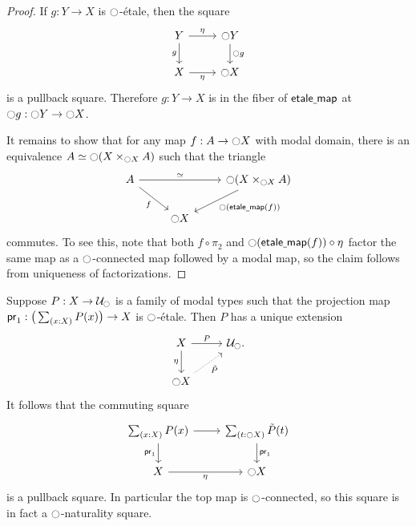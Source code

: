 \documentclass[9pt,twosided]{amsart}
\begin{document}
\begin{proof}
If $g:Y\to X$ is ${\ocircle}$-\'etale, then the square
\begin{equation*}
\begin{tikzcd}
Y \arrow[d,swap,"g"] \arrow[r,"\modalunit"] & \modal Y \arrow[d,"\modal g"] \\
X \arrow[r,swap,"\modalunit"] & \modal X
\end{tikzcd}
\end{equation*}
is a pullback square. Therefore $g:Y\to X$ is in the fiber of $\mathsf{etale\underline{\ }{}map}$ at ${\ocircle} g : {\ocircle} Y\to{\ensuremath{\ocircle}} X$. 

It remains to show that for any map $f:A\to{\ensuremath{\ocircle}} X$ with modal domain, there is an equivalence $\eqv{A}{\modal (X\times_{\modal X} A)}$ such that the triangle
\begin{equation*}
\begin{tikzcd}
A \arrow[dr,swap,"f"] \arrow[rr,"\eqvsym"] & & \modal (X\times_{\modal X} A) \arrow[dl,"\modal(\etmap(f))"] \\
& \modal X
\end{tikzcd}
\end{equation*}
commutes. To see this, note that both $f\circ \pi_2$ and ${\ocircle}(\mathsf{etale\underline{\ }{}map}(f))\circ {\eta_{}}$ factor the same map as a ${\ocircle}$-connected map followed by a modal map, so the claim follows from uniqueness of factorizations.
\end{proof}

\begin{cor}
Suppose $P:X\to\mathcal{U}_{\ocircle}$ is a family of modal types such that the projection map $\proj 1:\big(\sm{x:X}P(x)\big)\to X$ is ${\ocircle}$-\'etale. Then $P$ has a unique extension
\begin{equation*}
\begin{tikzcd}
X \arrow[d,swap,"\modalunit"] \arrow[r,"P"] & \UU_\modal. \\
\modal X \arrow[ur,densely dotted,swap,"\tilde{P}"] 
\end{tikzcd}
\end{equation*}
It follows that the commuting square
\begin{equation*}
\begin{tikzcd}
\sm{x:X}P(x) \arrow[d,swap,"\proj 1"] \arrow[r] & \sm{t:\modal X}\tilde{P}(t) \arrow[d,"\proj 1"] \\
X \arrow[r,swap,"\modalunit"] & \modal X
\end{tikzcd}
\end{equation*}
is a pullback square. In particular the top map is ${\ocircle}$-connected, so this square is in fact a ${\ocircle}$-naturality square.
\end{cor}
\end{document}
